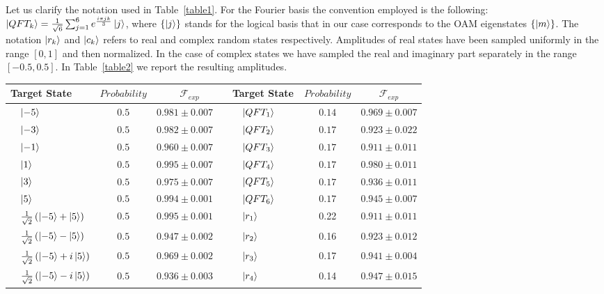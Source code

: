 Let us clarify the notation used in Table~\ref{table1}. For the Fourier basis the convention employed is the following: $\ket{QFT_k}=\frac{1}{\sqrt{6}}\sum_{j=1}^{6}e^{\frac{ i \pi jk }{3}}\ket{j}$, where $\{\ket{j}\}$ stands for the logical basis that in our case corresponds to the OAM eigenstates $\{\ket{m} \}$. The notation $\ket{r_k}$ and $\ket{c_k}$ refers to real and complex random states respectively. Amplitudes of real states have been sampled uniformly in the range $\left[0,1\right]$ and then normalized. In the case of complex states we have sampled the real and imaginary part separately in the range $\left[-0.5,0.5\right]$. In Table~\ref{table2} we report the resulting amplitudes.
\begin{table*}[h!]
\centering
\begin{tabular}{lcc|lcc}
\toprule
Target State & $Probability$  & $\mathcal{F}_{exp}$  & Target State & $Probability$  & $\mathcal{F}_{exp}$ \\
\midrule
 $\quad\ket{-5}$ & $0.5$  & $0.981 \pm 0.007\quad$ &$\quad\ket{QFT_1}\qquad $ & $0.14$ & $0.969\pm 0.007$\\
 $\quad\ket{-3}$ & $0.5$ & $0.982 \pm 0.007\quad$ &$\quad\ket{QFT_2}$ & $0.17$ & $0.923\pm 0.022$ \\
 $\quad\ket{-1}$ & $0.5$ & $0.960 \pm 0.007\quad$ &$\quad\ket{QFT_3}$ & $0.17$ & $0.911\pm 0.011$\\ 
 $\quad\ket{1}$ & $0.5$ & $0.995 \pm 0.007\quad$ & $\quad\ket{QFT_4}$&$0.17$ &  $0.980\pm 0.011$ \\
 $\quad\ket{3}$ & $0.5$ & $0.975 \pm 0.007\quad$ & $\quad\ket{QFT_5 }$& $0.17$& $0.936\pm 0.011$ \\
 $\quad\ket{5}$ & $0.5$ & $0.994 \pm 0.001\quad$ & $\quad\ket{QFT_6} $& $0.17$ & $0.945\pm 0.007$ \\
 $\quad\frac{1}{\sqrt{2}}\left(\ket{-5}+\ket{5} \right)$ & $0.5$  & $0.995 \pm 0.001\quad$ &$\quad\ket{r_1}$ & 0.22& $0.911\pm0.011$\\
 $\quad\frac{1}{\sqrt{2}}\left(\ket{-5}-\ket{5}\right)$ & $0.5$ & $0.947 \pm 0.002\quad$ &$\quad\ket{r_2}$  & 0.16 & $0.923 \pm 0.012$\\
 $\quad\frac{1}{\sqrt{2}}\left(\ket{-5}+i\ket{5}\right)$ & $0.5$ & $0.969 \pm 0.002\quad$ &$\quad\ket{r_3}$  & 0.17 & $0.941 \pm 0.004$\\ 
  $\quad\frac{1}{\sqrt{2}}\left(\ket{-5}-i\ket{5}\right)$ & $0.5$ & $0.936 \pm 0.003\quad$&$\quad\ket{r_4} $& 0.14 &$0.947 \pm 0.015$  \\

\end{tabular}
\end{table*}
